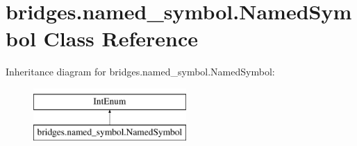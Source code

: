 \hypertarget{classbridges_1_1named__symbol_1_1_named_symbol}{}\section{bridges.\+named\+\_\+symbol.\+Named\+Symbol Class Reference}
\label{classbridges_1_1named__symbol_1_1_named_symbol}
Inheritance diagram for bridges.\+named\+\_\+symbol.\+Named\+Symbol\+:\begin{figure}[H]
\begin{center}
\leavevmode
\includegraphics[height=2.000000cm]{classbridges_1_1named__symbol_1_1_named_symbol}
\end{center}
\end{figure}
